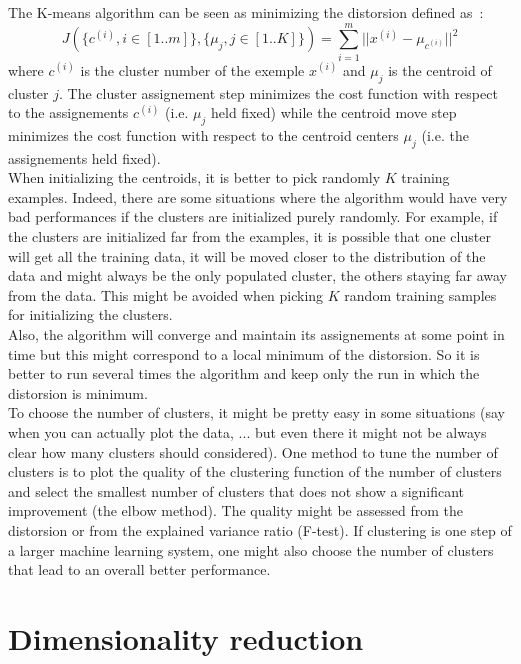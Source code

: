 \documentclass[10pt,a4paper]{article}
\begin{document}
The K-means algorithm can be seen as minimizing the distorsion defined as~:
\begin{equation}
J( \{c^{(i)}, i \in [1..m]\}, \{ \mu_j, j\in[1..K]\}) = \sum_{i=1}^m ||x^{(i)} - \mu_{c^{(i)}}||^2
\end{equation}
where $c^{(i)}$ is the cluster number of the exemple $x^{(i)}$ and $\mu_j$ is the centroid of cluster $j$. The cluster assignement step minimizes the cost function with respect to the assignements $c^{(i)}$ (i.e. $\mu_j$ held fixed) while the centroid move step minimizes the cost function with respect to the centroid centers $\mu_j$ (i.e. the assignements held fixed).\\

When initializing the centroids, it is better to pick randomly $K$ training examples. Indeed, there are some situations where the algorithm would have very bad performances if the clusters are initialized purely randomly. For example, if the clusters are initialized far from the examples, it is possible that one cluster will get all the training data, it will be moved closer to the distribution of the data and might always be the only populated cluster, the others staying far away from the data. This might be avoided when picking $K$ random training samples for initializing the clusters.\\

Also, the algorithm will converge and maintain its assignements at some point in time but this might correspond to a local minimum of the distorsion. So it is better to run several times the algorithm and keep only the run in which the distorsion is minimum.\\

To choose the number of clusters, it might be pretty easy in some situations (say when you can actually plot the data, ... but even there it might not be always clear how many clusters should considered). One method to tune the number of clusters is to plot the quality of the clustering function of the number of clusters and select the smallest number of clusters that does not show a significant improvement (the elbow method). The quality might be assessed from the distorsion or from the explained variance ratio (F-test). If clustering is one step of a larger machine learning system, one might also choose the number of clusters that lead to an overall better performance.


\section{Dimensionality reduction}
\end{document}
